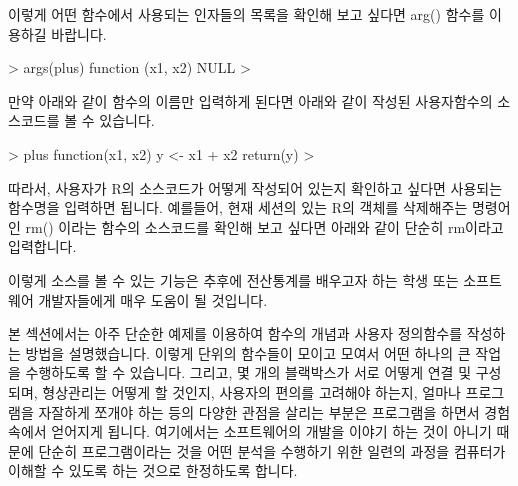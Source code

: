 \documentclass{book}
\begin{document}
이렇게 어떤 함수에서 사용되는 인자들의 목록을 확인해 보고 싶다면 arg() 함수를 이용하길 바랍니다. 

\begin{Schunk}
\begin{Soutput}
> args(plus)
function (x1, x2) 
NULL
> 
\end{Soutput}
\end{Schunk}

만약 아래와 같이 함수의 이름만 입력하게 된다면 아래와 같이 작성된 사용자함수의 소스코드를 볼 수 있습니다. 

\begin{Schunk}
\begin{Soutput}
> plus
function(x1, x2){
y <- x1 + x2
return(y)
}
> 
\end{Soutput}
\end{Schunk}

따라서, 사용자가 R의 소스코드가 어떻게 작성되어 있는지 확인하고 싶다면 사용되는 함수명을 입력하면 됩니다. 
예를들어, 현재 세션의 있는 R의 객체를 삭제해주는 명령어인 rm() 이라는 함수의 소스코드를 확인해 보고 싶다면 아래와 같이 단순히 rm이라고 입력합니다.

\begin{Schunk}
\end{Schunk}

이렇게 소스를 볼 수 있는 기능은 추후에 전산통계를 배우고자 하는 학생 또는 소프트웨어 개발자들에게 매우 도움이 될 것입니다. 

본 섹션에서는 아주 단순한 예제를 이용하여 함수의 개념과 사용자 정의함수를 작성하는 방법을 설명했습니다.  
이렇게 단위의 함수들이 모이고 모여서 어떤 하나의 큰 작업을 수행하도록 할 수 있습니다. 
그리고, 몇 개의 블랙박스가 서로 어떻게 연결 및  구성되며, 형상관리는 어떻게 할 것인지, 사용자의 편의를 고려해야 하는지, 얼마나 프로그램을 자잘하게 쪼개야 하는 등의 다양한 관점을 살리는 부분은 프로그램을 하면서 경험속에서 얻어지게 됩니다.
여기에서는 소프트웨어의 개발을 이야기 하는 것이 아니기 때문에 단순히 프로그램이라는 것을 어떤 분석을 수행하기 위한 일련의 과정을 컴퓨터가 이해할 수 있도록 하는 것으로 한정하도록 합니다.
\end{document}
